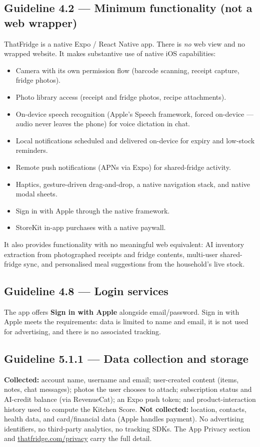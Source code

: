 \documentclass[11pt]{article}
\begin{document}
\subsection{Guideline 4.2 --- Minimum functionality (not a web wrapper)}
ThatFridge is a native Expo / React Native app. There is \emph{no} web view and no wrapped
website. It makes substantive use of native iOS capabilities:
\begin{itemize}
  \item Camera with its own permission flow (barcode scanning, receipt capture, fridge photos).
  \item Photo library access (receipt and fridge photos, recipe attachments).
  \item On-device speech recognition (Apple's Speech framework, forced on-device --- audio
        never leaves the phone) for voice dictation in chat.
  \item Local notifications scheduled and delivered on-device for expiry and low-stock
        reminders.
  \item Remote push notifications (APNs via Expo) for shared-fridge activity.
  \item Haptics, gesture-driven drag-and-drop, a native navigation stack, and native modal
        sheets.
  \item Sign in with Apple through the native framework.
  \item StoreKit in-app purchases with a native paywall.
\end{itemize}
It also provides functionality with no meaningful web equivalent: AI inventory extraction
from photographed receipts and fridge contents, multi-user shared-fridge sync, and
personalised meal suggestions from the household's live stock.

\subsection{Guideline 4.8 --- Login services}
The app offers \textbf{Sign in with Apple} alongside email/password. Sign in with Apple
meets the requirements: data is limited to name and email, it is not used for advertising,
and there is no associated tracking.

\subsection{Guideline 5.1.1 --- Data collection and storage}
\textbf{Collected:} account name, username and email; user-created content (items, notes,
chat messages); photos the user chooses to attach; subscription status and AI-credit balance
(via RevenueCat); an Expo push token; and product-interaction history used to compute the
Kitchen Score.
\textbf{Not collected:} location, contacts, health data, and card/financial data (Apple
handles payment). No advertising identifiers, no third-party analytics, no tracking SDKs.
The App Privacy section and \href{https://thatfridge.com/privacy/}{thatfridge.com/privacy}
carry the full detail.
\end{document}

